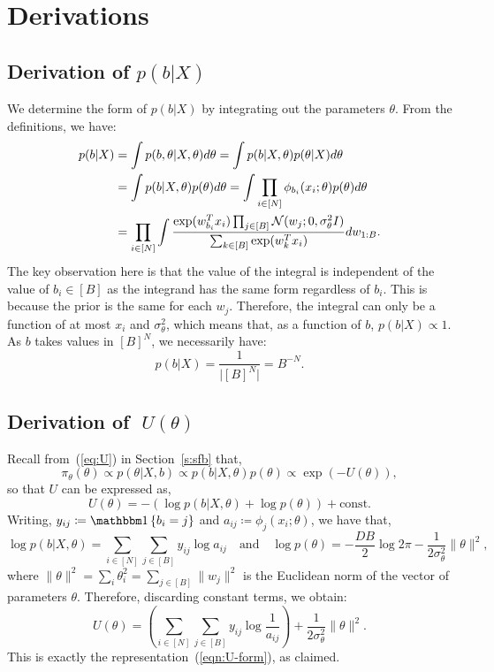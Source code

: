 \section{Derivations}

\subsection{Derivation of {\boldmath $p(b|X)$}}
\label{appdx:b|x}

We determine the form of $p(b| X)$ by integrating
out the parameters $\theta$. From the definitions, we have:
%
\begin{align*}
	p(b | X) &= \int p(b , \theta| X, \theta) d\theta = \int p(b | X, \theta) p(\theta | X) d\theta \\
	&=\int p(b | X, \theta) p(\theta) d\theta = \int \prod_{i \in [N] } \phi_{b_i}(x_i; \theta) p(\theta) d\theta \\
	&= \prod_{i \in [N]} \int \frac{\exp(w_{b_i}^T x_i) \prod_{j \in [B]} \mathcal{N}(w_j; 0, \sigma_\theta^2 I)}{\sum_{k \in [B]} \exp(w_{k}^T x_i)} dw_{1:B}.
\end{align*}
%
The key observation here is that 
the value of the integral is independent
of the value of $b_i \in [B]$ as
the integrand has the same form regardless of $b_i$. This is
because the prior is the same for each $w_j$. 
Therefore, the integral can only be a function of at most $x_i$ and $\sigma_\theta^2$,
which means that, as a function of $b$, $p(b|X)\propto 1$. As
$b$ takes values in $[B]^N$, we necessarily have:
%
\begin{equation}
	p(b | X) = \frac{1}{\big|[B]^N\big|}=B^{-N}.
\end{equation}

\subsection{Derivation of {\boldmath $\;U(\theta)$}}
\label{appdx:form-U}

Recall from~(\ref{eq:U}) in Section~\ref{s:sfb} that,
$$	\pi_\theta(\theta) \propto p(\theta | X, b) \propto p(b | X, \theta) p(\theta) \propto  \exp \left( - U(\theta) \right),
$$ 
so that $U$ can be expressed as,
$$
U(\theta) 
= - \left( \log p(b | X, \theta) + \log p(\theta) \right) + \textrm{const}.
$$
Writing,
$y_{ij} \coloneqq \one \left\{ b_i = j \right\}$ and 
$a_{ij} \coloneqq \phi_j(x_i; \theta)$, we have that,
%
\begin{equation}
	\log p(b | X, \theta) = \sum_{i \in [N]} \sum_{j \in [B]} y_{ij} \log a_{ij}  \quad \textrm{and} \quad
	\log p(\theta) = -\frac{D B}{2} \log 2\pi - \frac{1}{2 \sigma_\theta^2} 
	\|\theta \|^2,
	\label{eqn:U-constituent-terms}
\end{equation}
%
where
$\|\theta\|^2 = \sum_{i} \theta_{i}^2 = \sum_{j \in [B]} \|w_j\|^2$ 
is the Euclidean norm of the vector of parameters $\theta$.
Therefore, discarding constant terms, we 
obtain:
%
\begin{equation}
	U(\theta) = \left( \sum_{i \in [N]} \sum_{j \in [B]} y_{ij} \log \frac{1}{a_{ij}} \right)
	+ \frac{1}{2\sigma_\theta^2} \|\theta\|^2.
\end{equation}
%
This is exactly the representation~(\ref{eqn:U-form}), as claimed.

